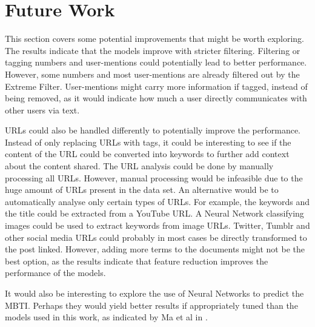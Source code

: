 \section{Future Work} \label{sec:future-work}

This section covers some potential improvements that might be worth exploring.
The results indicate that the models improve with stricter filtering.
Filtering or tagging numbers and user-mentions could potentially lead to better performance.
However, some numbers and most user-mentions are already filtered out by the Extreme Filter.
User-mentions might carry more information if tagged, instead of being removed, as it would indicate how much a user directly communicates with other users via text.

URLs could also be handled differently to potentially improve the performance.
Instead of only replacing URLs with tags, it could be interesting to see if the content of the URL could be converted into keywords to further add context about the content shared.
The URL analysis could be done by manually processing all URLs.
However, manual processing would be infeasible due to the huge amount of URLs present in the data set.
An alternative would be to automatically analyse only certain types of URLs.
For example, the keywords and the title could be extracted from a YouTube URL.
A Neural Network classifying images could be used to extract keywords from image URLs.
Twitter, Tumblr and other social media URLs could probably in most cases be directly transformed to the post linked.
However, adding more terms to the documents might not be the best option, as the results indicate that feature reduction improves the performance of the models. 

It would also be interesting to explore the use of Neural Networks to predict the MBTI.
Perhaps they would yield better results if appropriately tuned than the models used in this work, as indicated by Ma et al in \cite{maneural}.